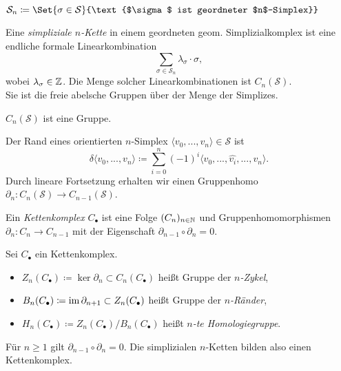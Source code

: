 \documentclass{cheat-sheet}
\newcommand{\angles}[1]{\langle #1 \rangle}
\newcommand{\Simpl}{\mathcal{S}} %
\newcommand{\CC}[1]{{#1}_{\bullet}} %
\begin{document}
\begin{nota}
  $\Simpl_n \coloneqq \Set{\sigma \in \Simpl}{\text{$\sigma$ ist geordneter $n$-Simplex}}$
\end{nota}

\begin{defn}
  Eine \emph{simpliziale $n$-Kette} in einem geordneten geom. Simplizialkomplex ist eine endliche formale Linearkombination
  \[ \sum_{\sigma \in \Simpl_n} \lambda_\sigma \cdot \sigma, \]
  wobei $\lambda_\sigma \in \mathbb{Z}$. Die Menge solcher Linearkombinationen ist $C_n(\Simpl)$.\\
  Sie ist die freie abelsche Gruppen über der Menge der Simplizes.
\end{defn}

\begin{bem}
  $C_n(\Simpl)$ ist eine Gruppe.
\end{bem}

\begin{defn}
  Der Rand eines orientierten $n$-Simplex $\angles{v_0, ..., v_n} \in \Simpl$ ist
  \[ \delta \angles{v_0, ..., v_n} \coloneqq \sum_{i=0}^n (-1)^i \angles{v_0, ..., \hat{v_i}, ..., v_n}. \]
  Durch lineare Fortsetzung erhalten wir einen Gruppenhomo $\partial_n : C_n(\Simpl) \to C_{n-1}(\Simpl)$.
\end{defn}


\begin{defn}
  Ein \emph{Kettenkomplex} $\CC{C}$ ist eine Folge $(C_n)_{n \in \mathbb{N}}$ und Gruppenhomomorphismen $\partial_n : C_n \to C_{n-1}$ mit der Eigenschaft $\partial_{n-1} \circ \partial_n = 0$.
\end{defn}

\begin{defn}
  Sei $\CC{C}$ ein Kettenkomplex.
  \begin{itemize}
    \item $Z_n(\CC{C}) \coloneqq \ker \partial_n \subset C_n(\CC{C})$ heißt Gruppe der \emph{$n$-Zykel},
    \item $B_n(\CC{C}) \coloneqq \im \partial_{n+1} \subset Z_n(\CC{C})$ heißt Gruppe der \emph{$n$-Ränder},
    \item $H_n(\CC{C}) \coloneqq Z_n(\CC{C}) / B_n(\CC{C})$ heißt \emph{$n$-te Homologiegruppe}.
  \end{itemize}
\end{defn}

\begin{prop}
  Für $n \geq 1$ gilt $\partial_{n-1} \circ \partial_n = 0$. Die simplizialen $n$-Ketten bilden also einen Kettenkomplex.
\end{prop}
\end{document}
